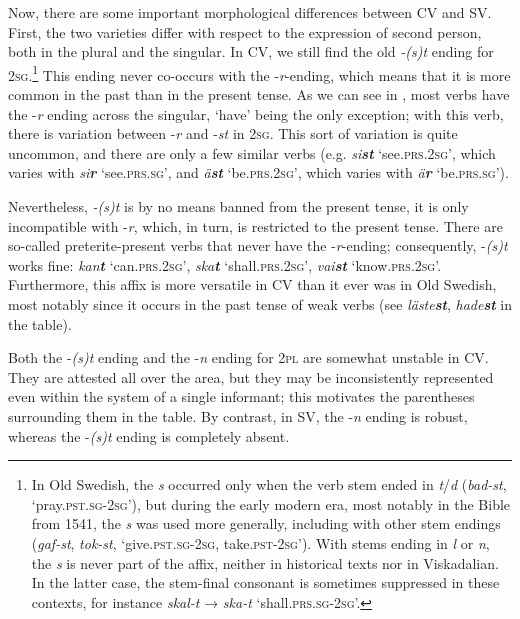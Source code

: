 \documentclass[output=paper,colorlinks,citecolor=brown,draft,draftmode]{langscibook}
\begin{document}
Now, there are some important morphological differences between CV and SV. First, the two varieties differ with respect to the expression of second person, both in the plural and the singular. In CV, we still find the old \textit{-(s)t} ending for 2\textsc{sg}.\footnote{In Old Swedish, the \textit{s} occurred only when the verb stem ended in \textit{t}/\textit{d} (\textit{bad-st}, ‘pray.\textsc{pst.sg}-\textsc{2sg}’), but during the early modern era, most notably in the Bible from 1541, the \textit{s} was used more generally, including with other stem endings (\textit{gaf-st}, \textit{tok-st}, ‘give.\textsc{pst.sg}-2\textsc{sg}, take.\textsc{pst}-\textsc{2sg}’). With stems ending in \textit{l} or \textit{n}, the \textit{s} is never part of the affix, neither in historical texts nor in Viskadalian. In the latter case, the stem-final consonant is sometimes suppressed in these contexts, for instance \textit{skal-t} → \textit{ska-t} ‘shall.\textsc{prs.sg}-2\textsc{sg}’.} This ending never co-occurs with the -\textit{r}-ending, which means that it is more common in the past than in the present tense. As we can see in , most verbs have the -\textit{r} ending across the singular, ‘have’ being the only exception; with this verb, there is variation between -\textit{r} and -\textit{st} in 2\textsc{sg}. This sort of variation is quite uncommon, and there are only a few similar verbs (e.g. \textit{si\textbf{{st}}} ‘see.\textsc{prs}.2\textsc{sg}’, which varies with \textit{si\textbf{{r}}} ‘see.\textsc{prs}.\textsc{sg}’, and \textit{ä\textbf{{st}}} ‘be.\textsc{prs.}2\textsc{sg}’, which varies with \textit{ä\textbf{{r}}} ‘be.\textsc{prs}.\textsc{sg}’).



Nevertheless, \textit{-(s)t} is by no means banned from the present tense, it is only incompatible with -\textit{r}, which, in turn, is restricted to the present tense. There are so-called preterite-present verbs that never have the -\textit{r}-ending; consequently, \mbox{-\textit{(s)t}} works fine: \textit{kan\textbf{{t}}} ‘can.\textsc{prs}.2\textsc{sg}’, \textit{ska\textbf{{t}}} ‘shall.\textsc{prs}.2\textsc{sg}’, \textit{vai\textbf{{st}}} ‘know.\textsc{prs.}2\textsc{sg}’. Furthermore, this affix is more versatile in CV than it ever was in Old Swedish, most notably since it occurs in the past tense of weak verbs (see \textit{läste\textbf{{st}}}, \textit{hade\textbf{{st}}} in the table).



Both the -\textit{(s)t} ending and the -\textit{n} ending for 2\textsc{pl} are somewhat unstable in CV. They are attested all over the area, but they may be inconsistently represented even within the system of a single informant; this motivates the parentheses surrounding them in the table. By contrast, in SV, the -\textit{n} ending is robust, whereas the -\textit{(s)t} ending is completely absent.
\end{document}
